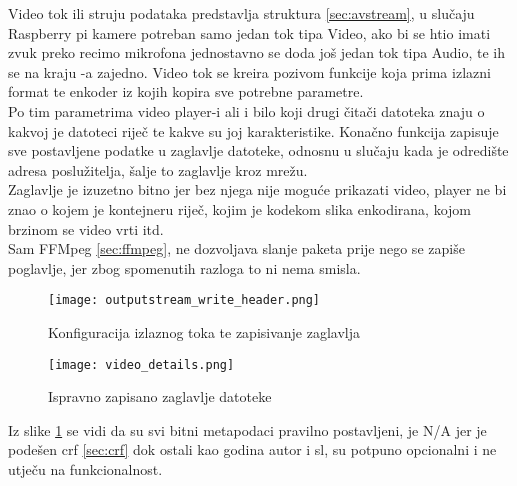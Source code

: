 \label{sec:output_format_ctx}
Video tok ili struju podataka predstavlja struktura  \ref{sec:avstream}, u slučaju Raspberry pi kamere
potreban samo jedan tok tipa Video, ako bi se htio imati zvuk preko recimo mikrofona jednostavno se doda još jedan tok
tipa Audio, te ih se na kraju -a zajedno.
\paraBreak
Video tok se kreira pozivom funkcije  koja prima izlazni format te enkoder iz kojih
kopira sve potrebne parametre. \\
Po tim parametrima video player-i ali i bilo koji drugi čitači datoteka znaju o kakvoj je datoteci riječ te kakve su joj
karakteristike.
\paraBreak
Konačno funkcija  zapisuje sve postavljene podatke u zaglavlje datoteke, odnosnu u slučaju
kada je odredište adresa poslužitelja, šalje to zaglavlje kroz mrežu. \\
Zaglavlje je izuzetno bitno jer bez njega nije moguće prikazati video, player ne bi znao o kojem je kontejneru riječ, kojim
je kodekom slika enkodirana, kojom brzinom se video vrti itd. \\
Sam FFMpeg \ref{sec:ffmpeg}, ne dozvoljava slanje paketa prije nego se zapiše poglavlje, jer zbog spomenutih razloga to ni
nema smisla. \cite{ffmpegDocs}

\begin{figure}[h]
  \texttt{[image: outputstream\_write\_header.png]}
  \caption{Konfiguracija izlaznog toka te zapisivanje zaglavlja}
\end{figure}

\begin{figure}[h]
  \centering
  \texttt{[image: video\_details.png]}
  \caption{Ispravno zapisano zaglavlje datoteke}
  \label{pic:file_props}
\end{figure}
Iz slike \ref{pic:file_props} se vidi da su svi bitni metapodaci pravilno postavljeni,  je N/A jer
je podešen crf \ref{sec:crf} dok ostali kao godina autor i sl, su potpuno opcionalni i ne utječu na funkcionalnost.

